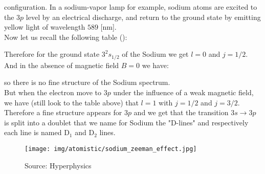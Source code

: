 	\begin{tcolorbox}[colframe=black,colback=white,sharp corners]
	
	configuration. In a sodium-vapor lamp for example, sodium atoms are excited to the $3p$ level by an electrical discharge, and return to the ground state by emitting yellow light of wavelength $589$ [nm].\\
	
	Now let us recall the following table ():
	
	Therefore for the ground state $3^2s_{1/2}$ of the Sodium we get $l=0$ and $j=1/2$. And in the absence of magnetic field $B=0$ we have:
	
	so there is no fine structure of the Sodium spectrum.\\
	
	But when the electron move to $3p$ under the influence of a weak magnetic field, we have (still look to the table above) that $l=1$ with $j=1/2$ and $j=3/2$. \\
	
	Therefore a fine structure appears for $3p$ and we get that the transition $3s\rightarrow 3p$ is split into a doublet that we name for Sodium the "D-lines" and respectively each line is named $\text{D}_1$ and $\text{D}_2$ lines. 
	\begin{figure}[H]
		\centering
		\texttt{[image: img/atomistic/sodium\_zeeman\_effect.jpg]}	
		\caption{Source: Hyperphysics}
	\end{figure}
	\end{tcolorbox}
	
